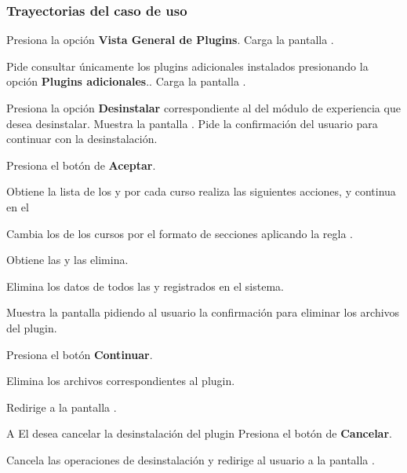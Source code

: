 \subsubsection{Trayectorias del caso de uso}

\begin{UCtrayectoria}%
%
  \Actor Presiona la opción {\bf Vista General de Plugins}.
  \Sistema Carga la pantalla .

  \Actor Pide consultar únicamente los plugins adicionales instalados presionando
         la opción {\bf Plugins adicionales}..
  \Sistema Carga la pantalla .

  \Actor Presiona la opción {\bf Desinstalar} correspondiente al
          del módulo de experiencia que desea desinstalar.
  \Sistema Muestra la pantalla .
  \Sistema Pide la confirmación del usuario para continuar con la desinstalación.

  \Actor Presiona el botón de {\bf Aceptar}. 

  \Sistema Obtiene la lista de los  y por cada curso
           realiza las siguientes acciones, y continua en el \label{CU-E03-loop-delete-course}

  \Sistema Cambia los  de los cursos por el formato de 
           secciones aplicando la regla .

  \Sistema Obtiene las  
           y las elimina.

  \Sistema Elimina los datos de todos las  y  
           registrados en el sistema.

  \Sistema Muestra la pantalla  pidiendo al usuario la confirmación
           para eliminar los archivos del plugin.

  \Actor Presiona el botón {\bf Continuar}. 


  \Sistema Elimina los archivos correspondientes al plugin.

  \Sistema Redirige a la pantalla .

\end{UCtrayectoria}

\begin{UCtrayectoriaA}{A}{%
El  desea cancelar la desinstalación del plugin
}
  \Actor Presiona el botón de {\bf Cancelar}.

  \Sistema Cancela las operaciones de desinstalación y redirige al usuario a la 
           pantalla .
\end{UCtrayectoriaA}

